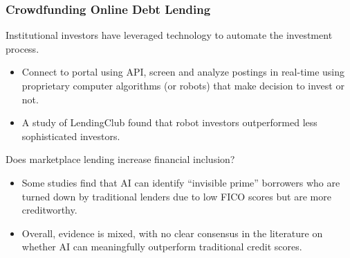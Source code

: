 \documentclass[aspectratio=169,xcolor=dvipsnames]{beamer}
\begin{document}

\begin{frame}
\frametitle{Crowdfunding Online Debt Lending}


Institutional investors have leveraged technology to automate the investment process. 
\begin{itemize}
    \item Connect to portal using API, screen and analyze postings in real-time using proprietary computer algorithms (or robots) that make decision to invest or not.
    \item A study of LendingClub found that robot investors outperformed less sophisticated investors. 
\end{itemize}

\medskip 

Does marketplace lending increase financial inclusion?
\begin{itemize}
    \item Some studies find that AI can identify “invisible prime” borrowers who are turned down by traditional lenders due to low FICO scores but are more creditworthy. 
    \item Overall, evidence is mixed, with no clear consensus in the literature on whether AI can meaningfully outperform traditional credit scores. 
\end{itemize}


\end{frame} 




\end{document}
